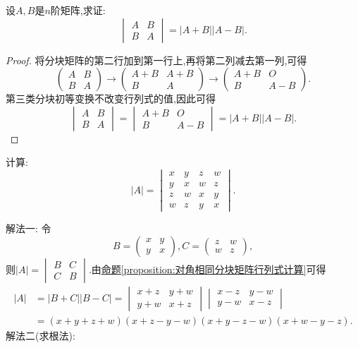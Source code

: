 \documentclass[lang=cn,newtx,10pt,scheme=chinese]{elegantbook}
\begin{document}
\begin{proposition}\label{proposition:对角相同分块矩阵行列式计算}
设\(A,B\)是\(n\)阶矩阵,求证:
\[
\begin{vmatrix}
A & B\\
B & A
\end{vmatrix}=|A + B||A - B|.
\]
\end{proposition}
\begin{proof}
将分块矩阵的第二行加到第一行上,再将第二列减去第一列,可得
\[
\begin{pmatrix}
A & B\\
B & A
\end{pmatrix}\to\begin{pmatrix}
A + B & A + B\\
B & A
\end{pmatrix}\to\begin{pmatrix}
A + B & O\\
B & A - B
\end{pmatrix}.
\]
第三类分块初等变换不改变行列式的值,因此可得
\[
\begin{vmatrix}
A & B\\
B & A
\end{vmatrix}=\begin{vmatrix}
A + B & O\\
B & A - B
\end{vmatrix}=|A + B||A - B|.
\]
\end{proof}

\begin{example}
计算:
\[
|A| = 
\begin{vmatrix}
x & y & z & w\\
y & x & w & z\\
z & w & x & y\\
w & z & y & x
\end{vmatrix}.
\]
\end{example}
\begin{solution}
{\color{blue}解法一:}
令
\[
B = 
\begin{pmatrix}
x & y\\
y & x
\end{pmatrix},
C = 
\begin{pmatrix}
z & w\\
w & z
\end{pmatrix},
\]
则\(|A| = 
\begin{vmatrix}
B & C\\
C & B
\end{vmatrix}\).由\hyperref[proposition:对角相同分块矩阵行列式计算]{命题\ref{proposition:对角相同分块矩阵行列式计算}}可得
\begin{align*}
|A|&=|B + C||B - C|
=\begin{vmatrix}
x + z & y + w\\
y + w & x + z
\end{vmatrix}\begin{vmatrix}
x - z & y - w\\
y - w & x - z
\end{vmatrix}\\
&=(x + y + z + w)(x + z - y - w)(x + y - z - w)(x + w - y - z).
\end{align*}
{\color{blue}解法二(求根法):}
\end{solution}
\end{document}
